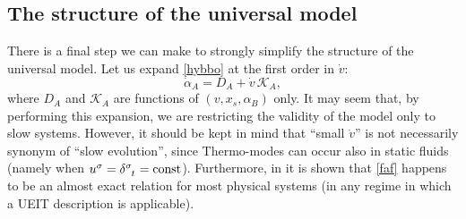 \documentclass[a4paper, amsfonts, amssymb, amsmath, reprint, twocolumn, showkeys, nofootinbib]{revtex4-2}
\begin{document}
\subsection{The structure of the universal model}\label{jejnjujskhahm}

There is a final step we can make to strongly simplify the structure of the universal model. Let us expand \eqref{hybbo} at the first order in $\dot{v}$:
\begin{equation}\label{faf}
\dot{\alpha}_A  = D_A  + \dot{v} \, \mathcal{K}_A ,
\end{equation}
where $D_A$ and $ \mathcal{K}_A $ are functions of $(v,x_s,\alpha_B)$ only. It may seem that, by performing this expansion, we are restricting the validity of the model only to slow systems. However, it should be kept in mind that ``small $\dot{v}$'' is not necessarily synonym of ``slow evolution'', since Thermo-modes can occur also in static fluids (namely when $u^\sigma = \delta\indices{^\sigma _t}=\text{const}$). Furthermore, in \cite{BulkGavassino} it is shown that \eqref{faf} happens to be an almost exact relation for most physical systems (in any regime in which a UEIT description is applicable). 
\end{document}
